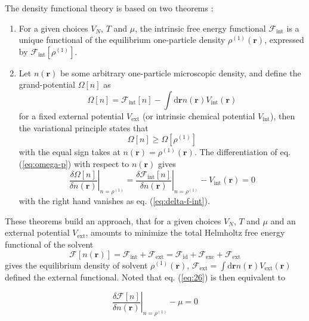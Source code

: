 The density functional theory is based on two theorems :
\begin{enumerate}
\item For a given choices $V_{N}$, $T$ and $\mu$, the intrinsic free
energy functional $\mathcal{F}_{\mathrm{int}}$ is a unique functional
of the equilibrium one-particle density $\rho^{(1)}(\mathbf{r})$,
expressed by $\mathcal{F}_{\mathrm{int}}[\rho^{(1)}]$.
\item Let $n(\mathbf{r})$ be some arbitrary one-particle microscopic density,
and define the grand-potential $\Omega[n]$ as
\begin{equation}
\Omega[n]=\mathcal{F}_{\mathrm{int}}[n]-\int\mathrm{d}\mathbf{r}n(\mathbf{r})V_{\mathrm{int}}(\mathbf{r})\label{eq:omega-p}
\end{equation}
for a fixed external potential $V_{\mathrm{ext}}$ (or intrinsic chemical
potential $V_{\mathrm{int}}$), then the variational principle states
that
\begin{equation}
\Omega[n]\geq\Omega[\rho^{(1)}]
\end{equation}
with the equal sign takes at $n(\mathbf{r})=\rho^{(1)}(\mathbf{r})$.
The differentiation of eq. (\ref{eq:omega-p}) with respect to $n(\mathbf{r})$
gives
\begin{equation}
\left.\frac{\delta\Omega[n]}{\delta n(\mathbf{r})}\right|_{n=\rho^{(1)}}=\left.\frac{\delta\mathcal{F}_{\mathrm{int}}[n]}{\delta n(\mathbf{r})}\right|_{n=\rho^{(1)}}-V_{\mathrm{int}}(\mathbf{r})=0\label{eq:26}
\end{equation}
with the right hand vanishes as eq. (\ref{eq:delta-f-int}).
\end{enumerate}
These theorems build an approach, that for a given choices $V_{N}$,
$T$ and $\mu$ and an external potential $V_{\mathrm{ext}}$, amounts
to minimize the total Helmholtz free energy functional of the solvent
\begin{equation}
\mathcal{F}[n(\mathbf{r})]=\mathcal{F}_{\mathrm{int}}+\mathcal{F}_{\mathrm{ext}}=\mathcal{F}_{\mathrm{id}}+\mathcal{F}_{\mathrm{exc}}+\mathcal{F}_{\mathrm{ext}}
\end{equation}
gives the equilibrium density of solvent $\rho^{(1)}(\mathbf{r})$,
$\mathcal{F}_{\mathrm{ext}}=\int\mathrm{d}\mathbf{r}n(\mathbf{r})V_{\mathrm{ext}}(\mathbf{r})$
defined the external functional. Noted that eq. (\ref{eq:26}) is
then equivalent to

\begin{equation}
\left.\frac{\delta\mathcal{F}[n]}{\delta n(\mathbf{r})}\right|_{n=\rho^{(1)}}-\mu=0
\end{equation}

